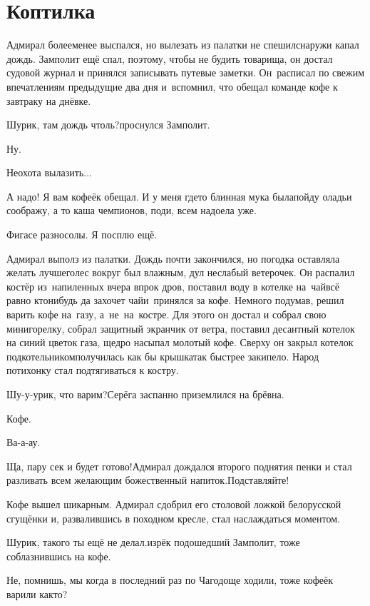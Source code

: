 \chapter{Коптилка}
\vepsianrose

Адмирал более\sdash менее выспался, но вылезать из палатки не спешил\mdash снаружи капал дождь. Замполит ещё спал, поэтому, чтобы не будить товарища, он достал судовой журнал и принялся записывать путевые заметки. Он~расписал по свежим впечатлениям предыдущие два дня и~вспомнил, что обещал команде кофе к завтраку на днёвке.

\diagdash Шурик, там дождь чтоль?\mdash проснулся Замполит.

\diagdash Ну.

\diagdash Неохота вылазить$\ldots$

\diagdash А надо! Я вам кофеёк обещал. И у меня где\sdash то блинная мука была\mdash пойду оладьи соображу, а то каша чемпионов, поди, всем надоела уже.

\diagdash Фигасе разносолы. Я посплю ещё.

Адмирал выполз из палатки. Дождь почти закончился, но погодка оставляла желать лучшего\mdash лес вокруг был влажным, дул неслабый ветерочек. Он распалил костёр из~напиленных вчера впрок дров, поставил воду в котелке на~чай\mdash всё равно кто\sdash нибудь да захочет чай\mdash и~принялся за кофе. Немного подумав, решил варить кофе на~газу, а~не~на~костре. Для этого он достал и собрал свою мини\sdash горелку, собрал защитный экранчик от ветра, поставил десантный котелок на синий цветок газа, щедро насыпал молотый кофе. Сверху он закрыл котелок подкотельником\mdash получилась как бы крышка\mdash так быстрее закипело. Народ потихонку стал подтягиваться к костру.

\diagdash Шу-у-урик, что варим?\mdash Серёга заспанно приземлился на брёвна.

\diagdash Кофе.

\diagdash Ва-а-ау.

\diagdash Ща, пару сек и будет готово!\mdash Адмирал дождался второго поднятия пенки и стал разливать всем желающим божественный напиток.\mdash Подставляйте!

Кофе вышел шикарным. Адмирал сдобрил его столовой ложкой белорусской сгущёнки и, развалившись в походном кресле, стал наслаждаться моментом.

\diagdash Шурик, такого ты ещё не делал.\mdash изрёк подошедший Замполит, тоже соблазнившись на кофе.

\diagdash Не, помнишь, мы когда в последний раз по Чагодоще ходили, тоже кофеёк варили как\sdash то?


